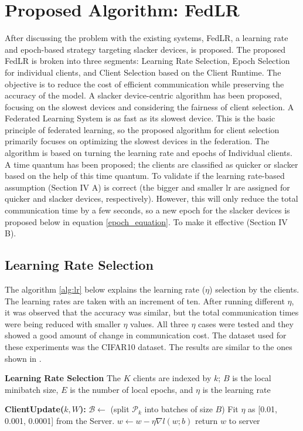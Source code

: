 \documentclass[conference]{IEEEtran}
\begin{document}
\section{Proposed Algorithm: FedLR}
After discussing the problem with the existing systems, FedLR, a learning rate and epoch-based strategy targeting slacker devices, is proposed. The proposed FedLR is broken into three segments: Learning Rate Selection, Epoch Selection for individual clients, and Client Selection based on the Client Runtime. The objective is to reduce the cost of efficient communication while preserving the accuracy of the model. A slacker device-centric algorithm has been proposed, focusing on the slowest devices and considering the fairness of client selection. A Federated Learning System is as fast as its slowest device. This is the basic principle of federated learning, so the proposed algorithm for client selection primarily focuses on optimizing the slowest devices in the federation. The algorithm is based on turning the learning rate and epochs of Individual clients. A time quantum has been proposed; the clients are classified as quicker or slacker based on the help of this time quantum. To validate if the learning rate-based assumption (Section IV A) is correct (the bigger and smaller lr are assigned for quicker and slacker devices, respectively). However, this will only reduce the total communication time by a few seconds, so a new epoch for the slacker devices is proposed below in equation \ref{epoch_equation}. To make it effective (Section IV B).
\subsection{Learning Rate Selection}
The algorithm \ref{alg:lr} below explains the learning rate ($\eta$) selection by the clients. The learning rates are taken with an increment of ten. After running different $\eta$, it was observed that the accuracy was similar, but the total communication times were being reduced with smaller $\eta$ values. All three $\eta$ cases were tested and they showed a good amount of change in communication cost. The dataset used for these experiments was the CIFAR10 dataset. The results are similar to the ones shown in \cite{negi2023study}.
 
 \begin{algorithm}
 	\scriptsize
 	\caption{ \textbf{Learning Rate Selection} The $K$ clients are
 		indexed by $k$; $B$ is the local minibatch size, $E$ is the number
 		of local epochs, and $\eta$ is the learning rate}\label{alg:lr}
 	\begin{algorithmic}[1]
 		
 		
 		\State \textbf{ClientUpdate($k,W$):} 
 		\State $\mathcal{B} \gets$ (split $\mathcal{P}_k$ into batches of size $B$)
 		\State Fit $\eta$ as [0.01, 0.001, 0.0001] from the Server.
 		\State $w \gets w - \eta \nabla l(w;b)$
 		\EndFor
 		\EndFor
 		\State return $w$ to server
 		
 	\end{algorithmic}
 \end{algorithm}
 
\end{document}
